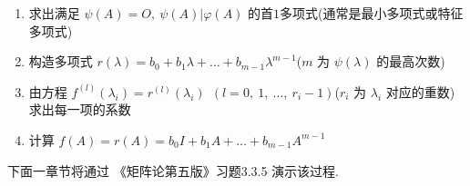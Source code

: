             \begin{enumerate}
                \item 求出满足 $\psi(A) = O, \ \psi(A) | \varphi(A)$ 的首$1$多项式(通常是最小多项式或特征多项式)
                \item 构造多项式 $r(\lambda) = b_0 + b_1\lambda + \dots + b_{m-1}\lambda^{m-1}$($m$ 为 $\psi(\lambda)$ 的最高次数)
                \item 由方程 $f^{(l)}(\lambda_i) = r^{(l)}(\lambda_i) \ \ (l = 0, \ 1, \ \dots, \ r_i - 1)$($r_i$ 为 $\lambda_i$ 对应的重数) 求出每一项的系数
                \item 计算 $f(A) = r(A) = b_0I + b_1A + \dots + b_{m-1}A^{m-1}$
            \end{enumerate}
            \par 下面一章节将通过 《矩阵论第五版》习题3.3.5 演示该过程.
